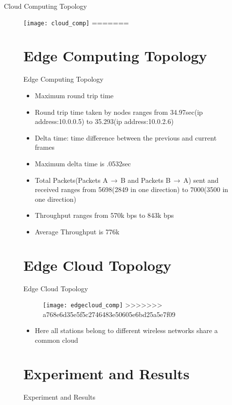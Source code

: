 \documentclass{beamer}
\begin{document}
\begin{frame}{Cloud Computing Topology}
\begin{figure}
\texttt{[image: cloud\_comp]}
=======
\section{Edge Computing Topology}

\begin{frame}{Edge Computing Topology}
\begin{itemize}
	\item Maximum round trip time
	\item Round trip time taken by nodes ranges from 34.97sec(ip address:10.0.0.5) to 35.293(ip address:10.0.2.6)
	\item Delta time: time difference between the previous and current frames
	\item Maximum delta time is .0532sec
	\item Total Packets(Packets A$\,\to\,$B and Packets B$\,\to\,$A) sent and received ranges from 5698(2849 in one direction) to 7000(3500 in one direction)
	\item Throughput ranges from 570k bps to 843k bps
	\item Average Throughput is 776k 
	

\end{itemize}
\end{frame}

\section{Edge Cloud Topology}

\begin{frame}{Edge Cloud Topology}
\begin{figure}
\texttt{[image: edgecloud\_comp]}
>>>>>>> a768e6d35e5f5c2746483e50605e6bd25a5e7f09
\centering
\end{figure}

\begin{itemize}
<<<<<<< HEAD
	\item Here all stations belong to different wireless networks share a common cloud

\end{itemize}
\end{frame}
\section{Experiment and Results}
\begin{frame}{Experiment and Results}


\end{frame}
\end{figure}
\end{frame}
\end{document}
